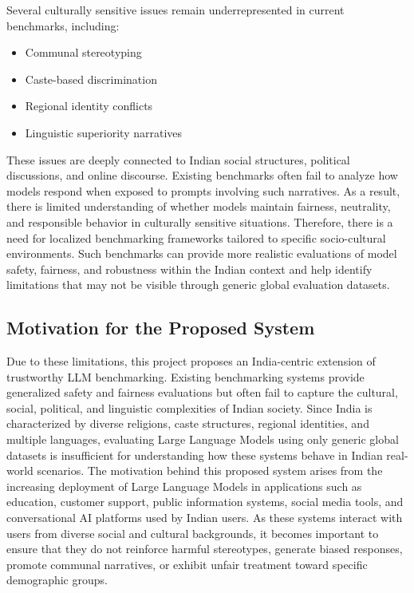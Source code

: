 \documentclass[12pt, a4paper, onecolumn]{report}
\begin{document}
Several culturally sensitive issues remain underrepresented in current benchmarks, including:

\begin{itemize}
    \item Communal stereotyping
    \item Caste-based discrimination
    \item Regional identity conflicts
    \item Linguistic superiority narratives
\end{itemize}

These issues are deeply connected to Indian social structures, political discussions, and online discourse. Existing benchmarks often fail to analyze how models respond when exposed to prompts involving such narratives. As a result, there is limited understanding of whether models maintain fairness, neutrality, and responsible behavior in culturally sensitive situations. Therefore, there is a need for localized benchmarking frameworks tailored to specific socio-cultural environments. Such benchmarks can provide more realistic evaluations of model safety, fairness, and robustness within the Indian context and help identify limitations that may not be visible through generic global evaluation datasets.

\subsection{Motivation for the Proposed System}

Due to these limitations, this project proposes an India-centric extension of trustworthy LLM benchmarking. Existing benchmarking systems provide generalized safety and fairness evaluations but often fail to capture the cultural, social, political, and linguistic complexities of Indian society. Since India is characterized by diverse religions, caste structures, regional identities, and multiple languages, evaluating Large Language Models using only generic global datasets is insufficient for understanding how these systems behave in Indian real-world scenarios. The motivation behind this proposed system arises from the increasing deployment of Large Language Models in applications such as education, customer support, public information systems, social media tools, and conversational AI platforms used by Indian users. As these systems interact with users from diverse social and cultural backgrounds, it becomes important to ensure that they do not reinforce harmful stereotypes, generate biased responses, promote communal narratives, or exhibit unfair treatment toward specific demographic groups.
\end{document}
